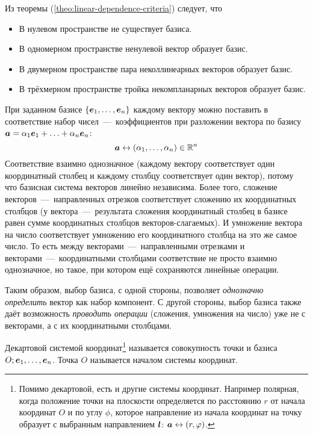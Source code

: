 \documentclass[a4paper,12pt]{article}
\begin{document}
  Из теоремы (\ref{theo:linear-dependence-criteria}) следует, что
  \begin{itemize}
    \item В нулевом пространстве не существует базиса.
    \item В одномерном пространстве ненулевой вектор образует базис.
    \item В двумерном пространстве пара неколлинеарных векторов образует базис.
    \item В трёхмерном пространстве тройка некомпланарных векторов образует базис.
  \end{itemize}
  
  \begin{remark}
    При заданном базисе $\{\boldsymbol e_1, \ldots, \boldsymbol e_n\}$ каждому вектору можно поставить в соответствие набор чисел~---~коэффициентов при разложении вектора по базису $\bds a \hm= \alpha_1 \bds e_1 \hm+ \ldots \hm+ \alpha_n \bds e_n$:
    \[
        \boldsymbol a \leftrightarrow (\alpha_1, \ldots, \alpha_n) \in \operatorname{\mathbb R}^n
    \]
    Соответствие взаимно однозначное (каждому вектору соответствует один координатный столбец и каждому столбцу соответствует один вектор), потому что базисная система векторов линейно независима.
    Более того, сложение векторов~---~направленных отрезков соответствует сложению их координатных столбцов (у вектора~---~результата сложения координатный столбец в базисе равен сумме координатных столбцов векторов-слагаемых).
    И умножение вектора на число соответствует умножению его координатного столбца на это же самое число.
    То есть между векторами~---~направленными отрезками и векторами~---~координатными столбцами соответствие не просто взаимно однозначное, но такое, при котором ещё сохраняются линейные операции.
    
    Таким образом, выбор базиса, с одной стороны, позволяет \emph{однозначно определить} вектор как набор компонент.
    С другой стороны, выбор базиса также даёт возможность \emph{проводить операции} (сложения, умножения на число) уже не с векторами, а с их координатными столбцами.
  \end{remark}
  
  \begin{definition}
    Декартовой системой координат\footnote{Помимо декартовой, есть и другие системы координат. Например полярная, когда положение точки на плоскости определяется по расстоянию $r$ от начала координат $O$ и по углу $\phi$, которое направление из начала координат на точку образует с выбранным направлением $\boldsymbol l$: $\bds a \hm\leftrightarrow (r, \phi)$.} называется совокупность точки и базиса $O; \boldsymbol e_1, \ldots, \boldsymbol e_n$.
    Точка $O$ называется началом системы координат.
  \end{definition}
  
\end{document}
